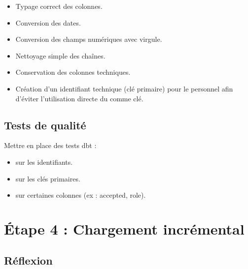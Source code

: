 \documentclass[11pt,a4paper]{article}
\begin{document}
\begin{itemize}
  \item Typage correct des colonnes.
  \item Conversion des dates.
  \item Conversion des champs numériques avec virgule.
  \item Nettoyage simple des chaînes.
  \item Conservation des colonnes techniques.
  \item Création d’un identifiant technique (clé primaire) pour le personnel
  afin d’éviter l’utilisation directe du  comme clé.
\end{itemize}

\subsection*{Tests de qualité}

Mettre en place des tests dbt :

\begin{itemize}
  \item {} sur les identifiants.
  \item {} sur les clés primaires.
  \item {} sur certaines colonnes (ex : accepted, role).
\end{itemize}



\section{Étape 4 : Chargement incrémental}

\subsection*{Réflexion}
\end{document}
